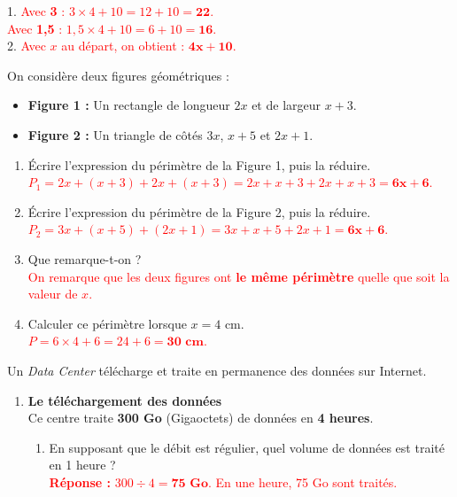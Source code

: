 \documentclass[a4paper]{book}
\begin{document}
{    
    \begin{exercice} 
        1. \textcolor{red}{Avec \textbf{3} : $3 \times 4 + 10 = 12 + 10 = \mathbf{22}$. \\ Avec \textbf{1,5} : $1,5 \times 4 + 10 = 6 + 10 = \mathbf{16}$.} \\
        2. \textcolor{red}{Avec $x$ au départ, on obtient : $\mathbf{4x + 10}$.}
    \end{exercice}
    

    
    \begin{exercice}
        On considère deux figures géométriques :
        \begin{itemize}
            \item \textbf{Figure 1 :} Un rectangle de longueur $2x$ et de largeur $x + 3$.
            \item \textbf{Figure 2 :} Un triangle de côtés $3x$, $x + 5$ et $2x + 1$.
        \end{itemize}
        \begin{enumerate}
            \item Écrire l'expression du périmètre de la Figure 1, puis la réduire. \\
            \textcolor{red}{$P_1 = 2x + (x+3) + 2x + (x+3) = 2x + x + 3 + 2x + x + 3 \mathbf{ = 6x + 6}$.}
            \item Écrire l'expression du périmètre de la Figure 2, puis la réduire. \\
            \textcolor{red}{$P_2 = 3x + (x + 5) + (2x + 1) = 3x + x + 5 + 2x + 1 \mathbf{ = 6x + 6}$.}
            \item Que remarque-t-on ? \\
            \textcolor{red}{On remarque que les deux figures ont \textbf{le même périmètre} quelle que soit la valeur de $x$.}
            \item Calculer ce périmètre lorsque $x = 4$ cm. \\
            \textcolor{red}{$P = 6 \times 4 + 6 = 24 + 6 \mathbf{ = 30 \text{ cm}}$.}
        \end{enumerate}
    \end{exercice}
    
    
    \begin{exercice} 
    Un \textit{Data Center} télécharge et traite en permanence des données sur Internet. 
    
    \begin{enumerate}
        \item \textbf{Le téléchargement des données} \\
        Ce centre traite \textbf{300 Go} (Gigaoctets) de données en \textbf{4 heures}.
        \begin{enumerate}
            \item En supposant que le débit est régulier, quel volume de données est traité en 1 heure ? \\
            \textcolor{red}{\textbf{Réponse :} $300 \div 4 = \mathbf{75 \text{ Go}}$. En une heure, 75 Go sont traités.}
            

\end{enumerate}
\end{enumerate}
\end{exercice}}
\end{document}
